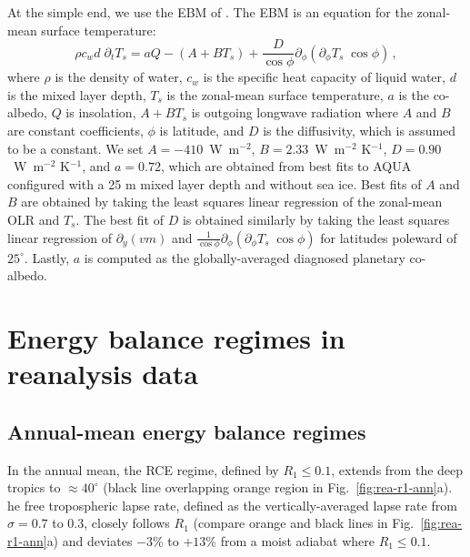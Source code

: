 \documentclass{ametsocV5}
\begin{document}
    At the simple end, we use the EBM of \cite{rose2017}. The EBM is an equation for the zonal-mean surface temperature:
    \begin{equation}
      \rho c_w d \; \partial_t T_s = aQ - (A+BT_s)  + \frac{D}{\cos\phi}\partial_\phi\left( \partial_\phi T_s \; \cos\phi \right)\, ,
    \end{equation}
    where $\rho$ is the density of water, $c_w$ is the specific heat capacity of liquid water, $d$ is the mixed layer depth, $T_s$ is the zonal-mean surface temperature, $a$ is the co-albedo, $Q$ is insolation, $A+BT_s$ is outgoing longwave radiation where $A$ and $B$ are constant coefficients, $\phi$ is latitude, and $D$ is the diffusivity, which is assumed to be a constant. We set $A=-410$~W~m$^{-2}$, $B=2.33$~W~m$^{-2}$ K$^{-1}$, $D=0.90$~W~m$^{-2}$ K$^{-1}$, and $a=0.72$, which are obtained from best fits to AQUA configured with a 25 m mixed layer depth and without sea ice. Best fits of $A$ and $B$ are obtained by taking the least squares linear regression of the zonal-mean $\mathrm{OLR}$ and $T_s$. The best fit of $D$ is obtained similarly by taking the least squares linear regression of $\partial_y (vm)$ and $\frac{1}{\cos\phi}\partial_\phi \left(\partial_\phi T_s \; \cos\phi \right)$ for latitudes poleward of $25^\circ$. Lastly, $a$ is computed as the globally-averaged diagnosed planetary co-albedo.

\section{Energy balance regimes in reanalysis data} \label{sec:diagnostics}
    \subsection{Annual-mean energy balance regimes}
    In the annual mean, the RCE regime, defined by $R_1 \le 0.1$, extends from the deep tropics to $\approx 40^\circ$ (black line overlapping orange region in Fig.~\ref{fig:rea-r1-ann}a). he free tropospheric lapse rate, defined as the vertically-averaged lapse rate from $\sigma=0.7$ to 0.3, closely follows $R_1$ (compare orange and black lines in Fig.~\ref{fig:rea-r1-ann}a) and deviates $-3$\% to $+13$\% from a moist adiabat where $R_1 \le 0.1$.
\end{document}
